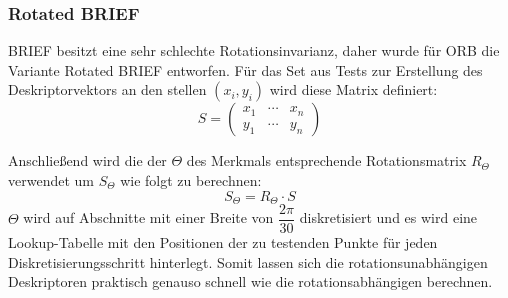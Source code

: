 \subsubsection{Rotated BRIEF}
BRIEF besitzt eine sehr schlechte Rotationsinvarianz, daher wurde für ORB die Variante Rotated BRIEF entworfen.
Für das Set aus Tests zur Erstellung des Deskriptorvektors an den stellen $(x_i, y_i)$ wird diese Matrix definiert:
\begin{equation}
S=
\begin{pmatrix}
x_1 & \cdots & x_n \\
y_1 & \cdots & y_n
\end{pmatrix}
\end{equation}

Anschließend wird die der $\Theta $ des Merkmals entsprechende Rotationsmatrix $R_\Theta$ verwendet um $S_\Theta $ wie folgt zu berechnen:
\begin{equation}
S_\Theta = R_\Theta \cdot S
\end{equation}
$\Theta$ wird auf Abschnitte mit einer Breite von $\dfrac{2\pi}{30}$ diskretisiert und es wird eine Lookup-Tabelle mit den Positionen der zu testenden Punkte für jeden Diskretisierungsschritt hinterlegt.
Somit lassen sich die rotationsunabhängigen Deskriptoren praktisch genauso schnell wie die rotationsabhängigen berechnen.